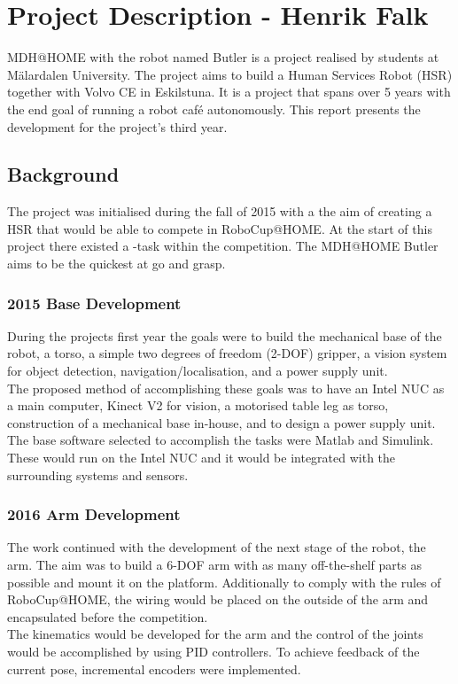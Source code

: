 \section{Project Description - Henrik Falk}
MDH@HOME with the robot named Butler is a project realised by students at Mälardalen University. The project aims to build a Human Services Robot (HSR) together with Volvo CE in Eskilstuna. It is a project that spans over 5 years with the end goal of running a robot café autonomously. This report presents the development for the project's third year.

\subsection{Background}
The project was initialised during the fall of 2015 with a the aim of creating a HSR that would be able to compete in RoboCup@HOME. At the start of this project there existed a -task within the competition. The MDH@HOME Butler aims to be the quickest at go and grasp.
\subsubsection{2015 Base Development}
During the projects first year the goals were to build the mechanical base of the robot, a torso, a simple two degrees of freedom (2-DOF) gripper, a vision system for object detection, navigation/localisation, and a power supply unit. \\
\indent The proposed method of accomplishing these goals was to have an Intel NUC as a main computer, Kinect V2 for vision, a motorised table leg as torso, construction of a mechanical base in-house, and to design a power supply unit.
The base software selected to accomplish the tasks were Matlab and Simulink. These would run on the Intel NUC and it would be integrated with the surrounding systems and sensors.

\subsubsection{2016 Arm Development}
The work continued with the development of the next stage of the robot, the arm. The aim was to build a 6-DOF arm with as many off-the-shelf parts as possible and mount it on the platform. Additionally to comply with the rules of RoboCup@HOME, the wiring would be placed on the outside of the arm and encapsulated before the competition. \\
\indent The kinematics would be developed for the arm and the control of the joints would be accomplished by using PID controllers. To achieve feedback of the current pose, incremental encoders were implemented.


